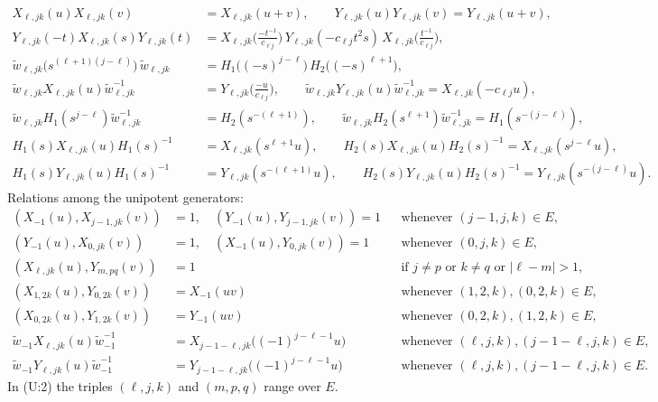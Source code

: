 \documentclass[11pt]{article}
\theoremstyle{definition}
\theoremstyle{remark}
\newcommand{\wt}{\widetilde{w}}
\begin{document}
\begin{align*}
X_{\ell,jk}(u)X_{\ell,jk}(v)&=X_{\ell,jk}(u+v),\qquad
Y_{\ell,jk}(u)Y_{\ell,jk}(v)=Y_{\ell,jk}(u+v), \tag{Im:1a,b}\\
Y_{\ell,jk}(-t)X_{\ell,jk}(s)Y_{\ell,jk}(t)&=X_{\ell,jk}\Big(\tfrac{-t^{-1}}{c_{\ell j}}\Big)\,Y_{\ell,jk}(-c_{\ell j}t^2s)\,X_{\ell,jk}\Big(\tfrac{t^{-1}}{c_{\ell j}}\Big), \tag{Im:2}\\
\wt_{\ell,jk}\big(s^{(\ell+1)(j-\ell)}\big)\,\wt_{\ell,jk}&=H_1\big((-s)^{j-\ell}\big)\,H_2\big((-s)^{\ell+1}\big), \tag{Im:3}\\
\wt_{\ell,jk}X_{\ell,jk}(u)\wt_{\ell,jk}^{-1}&=Y_{\ell,jk}\Big(\tfrac{-u}{c_{\ell j}}\Big),\qquad
\wt_{\ell,jk}Y_{\ell,jk}(u)\wt_{\ell,jk}^{-1}=X_{\ell,jk}(-c_{\ell j}u), \tag{Im:4a,b}\\
\wt_{\ell,jk}H_1(s^{j-\ell})\wt_{\ell,jk}^{-1}&=H_2(s^{-(\ell+1)}),\qquad
\wt_{\ell,jk}H_2(s^{\ell+1})\wt_{\ell,jk}^{-1}=H_1(s^{-(j-\ell)}), \tag{Im:5a,b}\\
H_1(s)X_{\ell,jk}(u)H_1(s)^{-1}&=X_{\ell,jk}(s^{\ell+1}u),\qquad
H_2(s)X_{\ell,jk}(u)H_2(s)^{-1}=X_{\ell,jk}(s^{j-\ell}u), \tag{Im:6a,b}\\
H_1(s)Y_{\ell,jk}(u)H_1(s)^{-1}&=Y_{\ell,jk}(s^{-(\ell+1)}u),\qquad
H_2(s)Y_{\ell,jk}(u)H_2(s)^{-1}=Y_{\ell,jk}(s^{-(j-\ell)}u). \tag{Im:6c,d}
\end{align*}
Relations among the unipotent generators:
\begin{align*}
(X_{-1}(u),X_{j-1,jk}(v))&=1,\quad (Y_{-1}(u),Y_{j-1,jk}(v))=1 &&\text{whenever }(j-1,j,k)\in E, \tag{U:1a,b}\\
(Y_{-1}(u),X_{0,jk}(v))&=1,\quad (X_{-1}(u),Y_{0,jk}(v))=1 &&\text{whenever }(0,j,k)\in E, \tag{U:1c,d}\\
(X_{\ell,jk}(u),Y_{m,pq}(v))&=1 &&\text{if } j\ne p \text{ or } k\ne q \text{ or } |\ell-m|>1, \tag{U:2}\\
(X_{1,2k}(u),Y_{0,2k}(v))&=X_{-1}(uv) &&\text{whenever }(1,2,k),(0,2,k)\in E, \tag{U:3a}\\
(X_{0,2k}(u),Y_{1,2k}(v))&=Y_{-1}(uv) &&\text{whenever }(0,2,k),(1,2,k)\in E, \tag{U:3b}\\
\wt_{-1}X_{\ell,jk}(u)\wt_{-1}^{-1}&=X_{j-1-\ell,jk}\big((-1)^{j-\ell-1}u\big) &&\text{whenever }(\ell,j,k),(j-1-\ell,j,k)\in E, \tag{U:4a}\\
\wt_{-1}Y_{\ell,jk}(u)\wt_{-1}^{-1}&=Y_{j-1-\ell,jk}\big((-1)^{j-\ell-1}u\big) &&\text{whenever }(\ell,j,k),(j-1-\ell,j,k)\in E. \tag{U:4b}
\end{align*}
In (U:2) the triples $(\ell,j,k)$ and $(m,p,q)$ range over $E$.
\end{document}
